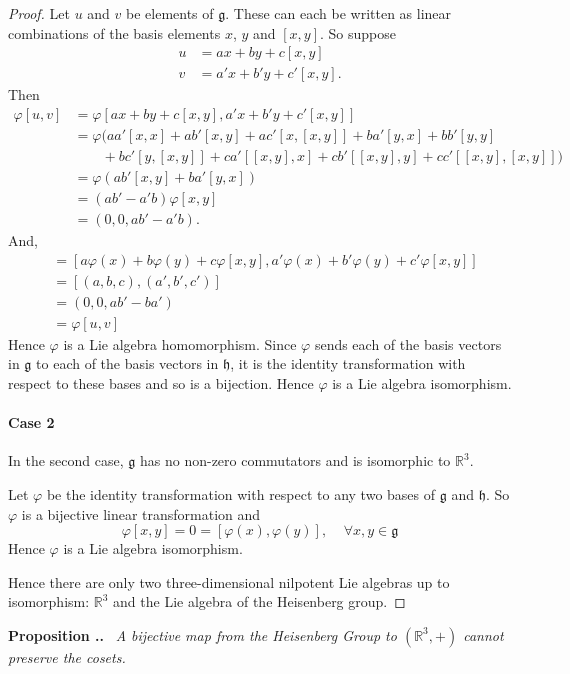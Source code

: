 \documentclass[honours]{UNSWthesis}
\newcommand{\R}{\mathbb{R}}
\newcommand{\g}{\mathfrak{g}}
\newcommand{\1}{\mathbf{e}_{1}}
\newcommand{\2}{\mathbf{e}_{3}}
\newcommand{\3}{\mathbf{e}_{3}}
\newcounter{Item}[section]
\newenvironment{Proposition}{\medskip
                            \refstepcounter{Item}
                            \noindent
                           {\bf Proposition \thesection.\theItem.}\ %
                            \begingroup \sl}
                           {\endgroup\medskip}
\begin{document}
\begin{proof}
Let $u$ and $v$ be elements of $\g$. These can each be written as linear combinations of the basis elements $x$, $y$ and $[x,y]$. So suppose
\begin{align*}
u &=ax+by+c[x,y] \\
v &=a'x+b'y+c'[x,y].
\end{align*}
Then
\begin{align*}
\varphi[u,v] &= \varphi [ax+by+c[x,y],a'x+b'y+c'[x,y]] \\
&=\varphi(aa'[x,x]+ab'[x,y]+ac'[x,[x,y]]+ba'[y,x]+bb'[y,y] \\
&\quad \quad+bc'[y,[x,y]]+ca'[[x,y],x]+cb'[[x,y],y]+cc'[[x,y],[x,y]])\\
&=\varphi(ab'[x,y]+ba'[y,x]) \\
&=(ab'-a'b)\varphi[x,y] \\
&=(0,0,ab'-a'b).
\end{align*}
And,
\begin{align*}
[\varphi(u),\varphi(v)] &=[a\varphi(x)+b\varphi(y)+c\varphi[x,y],a'\varphi(x)+b'\varphi(y)+c'\varphi[x,y]]\\
&=[(a,b,c),(a',b',c')]\\
&=(0,0,ab'-ba')\\
&=\varphi[u,v] 
\end{align*}
Hence $\varphi$ is a Lie algebra homomorphism. Since $\varphi$ sends each of the basis vectors in $\g$ to each of the basis vectors in $\mathfrak{h}$, it is the identity transformation with respect to these bases and so is a bijection. Hence $\varphi$ is a Lie algebra isomorphism.


\paragraph*{Case 2} In the second case, $\g$ has no non-zero commutators and is isomorphic to $\R^{3}$. 

Let $\varphi$ be the identity transformation with respect to any two bases of $\g$ and $\mathfrak{h}$. So $\varphi$ is a bijective linear transformation and 
\[
\varphi[x,y]=0=[\varphi(x),\varphi(y)], \;\;\;\; \forall x,y \in \g
\]
Hence $\varphi$ is a Lie algebra isomorphism.

Hence there are only two three-dimensional nilpotent Lie algebras up to isomorphism: $\R^{3}$ and the Lie algebra of the Heisenberg group.
\end{proof}

\begin{Proposition}
A bijective map from the Heisenberg Group to $(\R^{3},+)$ cannot preserve the cosets.
\end{Proposition}
\end{document}

